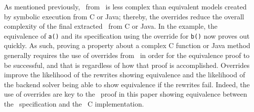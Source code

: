 As mentioned previously, \sawcore\ from \cryptol\ is less complex than equivalent models created by symbolic execution from C or Java;
thereby, the overrides reduce the overall complexity of the final extracted \sawcore\ from C or Java.
In the example, the equivalence of \texttt{a()} and its specification using the override for \texttt{b()} now proves out quickly.
As such, proving a property about a complex C function or Java method generally requires the use of overrides from \cryptol\ in order for the equivalence proof to be successful, and that is regardless of how that proof is accomplished.
Overrides improve the likelihood of the rewrites showing equivalence and the likelihood of the backend solver being able to show equivalence if the rewrites fail.
Indeed, the use of overrides are key to the \saw\ proof in this paper showing equivalence between the \shaThree\ specification and the \openssl\ C implementation.
